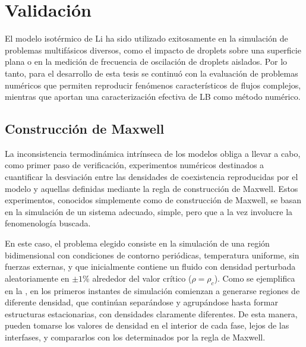 \section{Validaci\'on}

El modelo isot\'ermico de Li ha sido utilizado exitosamente en la simulaci\'on de problemas multif\'asicos diversos, como el impacto de droplets sobre una superficie plana o en la medici\'on de frecuencia de oscilaci\'on de droplets aislados. Por lo tanto, para el desarrollo de esta tesis se continu\'o con la evaluaci\'on de problemas num\'ericos que permiten reproducir fen\'omenos caracter\'isticos de flujos complejos, mientras que  aportan una caracterizaci\'on efectiva de LB como m\'etodo num\'erico.

\subsection{Construcci\'on de Maxwell}

La inconsistencia termodin\'amica intr\'inseca de los modelos \pp{} obliga a llevar a cabo, como primer paso de verificaci\'on, experimentos num\'ericos destinados a cuantificar la desviaci\'on entre las densidades de coexistencia reproducidas por el modelo y aquellas definidas mediante la regla de construcci\'on de Maxwell. Estos experimentos, conocidos simplemente como de construcci\'on de Maxwell, se basan en la simulaci\'on de un sistema adecuado, simple, pero que a la vez involucre la fenomenolog\'ia buscada.

En este caso, el problema elegido consiste en la simulaci\'on de una regi\'on bidimensional con condiciones de contorno peri\'odicas, temperatura uniforme, sin fuerzas externas, y que inicialmente contiene un fluido con densidad perturbada aleatoriamente en  $\pm 1\%$ alrededor del valor cr\'itico ($\rho=\rho_c$). Como se ejemplifica en la , en los primeros instantes de simulaci\'on comienzan a generarse regiones de diferente densidad, que contin\'uan separ\'andose y agrup\'andose hasta formar estructuras estacionarias, con densidades claramente diferentes. De esta manera, pueden tomarse los valores de densidad en el interior de cada fase, lejos de las interfases, y compararlos con los determinados por la regla de Maxwell.

